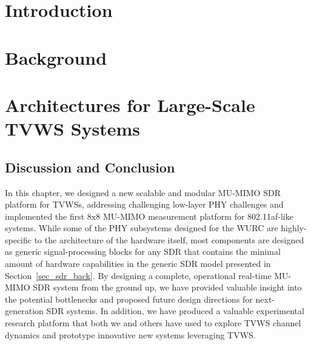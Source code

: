 \documentclass[oneside,12pt]{Ricethesis_PDF}
\begin{document}
\doublespacing

\acresetall


\chapter{Introduction}



\chapter{Background}
\label{sec_background_chapter}


\chapter{Architectures for Large-Scale TVWS Systems}
\label{sec_wurc}

	
	
	
	
	
	
	
	\section{Discussion and Conclusion}
	
	In this chapter, we designed a new scalable and modular \ac{MU-MIMO} \ac{SDR} platform for \acp{TVWS}, addressing challenging low-layer \ac{PHY} challenges and implemented the first 8x8 \ac{MU-MIMO} measurement platform for 802.11af-like systems.
	While some of the \ac{PHY} subsystems designed for the \ac{WURC} are highly-specific to the architecture of the hardware itself, most components are designed as generic signal-processing blocks for any \ac{SDR} that contains the minimal amount of hardware capabilities in the generic \ac{SDR} model presented in Section~\ref{sec_sdr_back}.
	By designing a complete, operational real-time \ac{MU-MIMO} \ac{SDR} system from the ground up, we have provided valuable insight into the potential bottlenecks and proposed future design directions for next-generation \ac{SDR} systems.
	In addition, we have produced a valuable experimental research platform that both we \cite{guerra2016opportunistic, anand2014case} and others \cite{wei2015acoustic, sur2015bridging, zhang2016watch, tarver2016sub} have used to explore \ac{TVWS} channel dynamics and prototype innovative new systems leveraging \ac{TVWS}.
	
\end{document}
